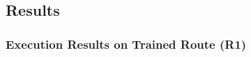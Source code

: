 \documentclass{article}
\begin{document}
\subsection{Results}



\subsubsection{Execution Results on Trained Route (R1)}

%


\end{document}
